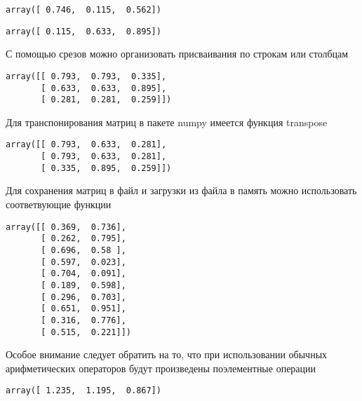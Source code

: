 \documentclass{article}
\begin{document}
    

    
    
    \begin{verbatim}
array([ 0.746,  0.115,  0.562])
    \end{verbatim}

    

    
    
    \begin{verbatim}
array([ 0.115,  0.633,  0.895])
    \end{verbatim}

    

    С помощью срезов можно организовать присваивания по строкам или столбцам

    
    
    \begin{verbatim}
array([[ 0.793,  0.793,  0.335],
       [ 0.633,  0.633,  0.895],
       [ 0.281,  0.281,  0.259]])
    \end{verbatim}

    

    Для транспонирования матриц в пакете numpy имеется функция transpose

    
    
    \begin{verbatim}
array([[ 0.793,  0.633,  0.281],
       [ 0.793,  0.633,  0.281],
       [ 0.335,  0.895,  0.259]])
    \end{verbatim}

    

    Для сохранения матриц в файл и загрузки из файла в память можно
использовать соответвующие функции

    
    
    \begin{verbatim}
array([[ 0.369,  0.736],
       [ 0.262,  0.795],
       [ 0.696,  0.58 ],
       [ 0.597,  0.023],
       [ 0.704,  0.091],
       [ 0.189,  0.598],
       [ 0.296,  0.703],
       [ 0.651,  0.951],
       [ 0.316,  0.776],
       [ 0.515,  0.221]])
    \end{verbatim}

    

    Особое внимание следует обратить на то, что при использовании обычных
арифметических операторов будут произведены поэлементные операции

    
    
    \begin{verbatim}
array([ 1.235,  1.195,  0.867])
    \end{verbatim}
\end{document}
